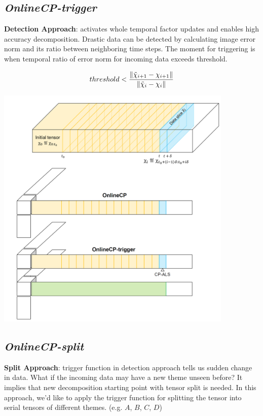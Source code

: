 \newpage
\subsection{\em OnlineCP-trigger}
\textbf{Detection Approach}: \cpals activates whole temporal factor updates and enables high accuracy decomposition. Drastic data can be detected by calculating image error norm and its ratio between neighboring time steps. The moment for triggering \cpals is when temporal ratio of error norm for incoming data exceeds threshold.

\begin{align*}
    threshold < \frac{\left\lVert\tilde{\chi}_{i+1}-\chi_{i+1}\right\rVert}{\left\lVert\tilde{\chi}_{i}-\chi_{i}\right\rVert}
\end{align*}

\begin{center}
	\includegraphics[width=0.85\textwidth]{FIG/OnlineCP-trigger.png}
\end{center}

\newpage
\subsection{\em OnlineCP-split}
\textbf{Split Approach}: trigger function in detection approach tells us sudden change in data. What if the incoming data may have a new theme unseen before? It implies that new decomposition starting point with tensor split is needed. In this approach, we'd like to apply the trigger function for splitting the tensor into serial tensors of different themes. (e.g. $A$, $B$, $C$, $D$)

